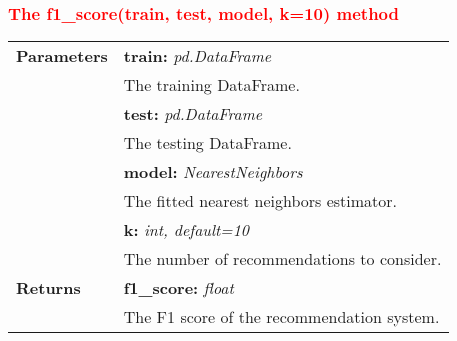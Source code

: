 \subsubsection{\textcolor{red}{The f1\_score(train, test, model, k=10) method}}

\vspace{-7mm}
\begin{table}[H]
\small
\begin{tabularx}{\textwidth}{|p{2cm}|X|}
\hline
\textbf{Parameters} & \textbf{train:} \textit{pd.DataFrame} \\ & \hspace{5mm} The training DataFrame. \\
& \textbf{test:} \textit{pd.DataFrame} \\ & \hspace{5mm} The testing DataFrame. \\
& \textbf{model:} \textit{NearestNeighbors} \\ & \hspace{5mm} The fitted nearest neighbors estimator. \\
& \textbf{k:} \textit{int, default=10} \\ & \hspace{5mm} The number of recommendations to consider. \\
\textbf{Returns} & \textbf{f1\_score:} \textit{float} \\ & \hspace{5mm} The F1 score of the recommendation system. \\
\hline
\end{tabularx}
\end{table}
